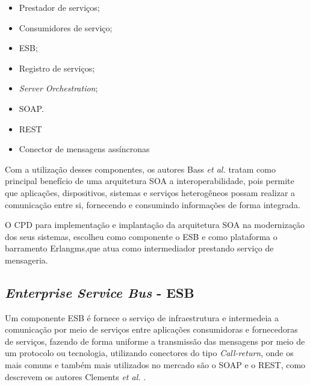 \begin{itemize}

\item Prestador de serviços;

\item Consumidores de serviço;

\item \acrfull{ESB};

\item Registro de serviços;

\item \textit{Server Orchestration}; 

\item \acrfull{SOAP}.

\item \acrfull{REST}

\item Conector de mensagens assíncronas

\end{itemize}

Com a utilização desses componentes, os autores Bass \textit{et al.}  \cite{bass2003software} tratam como principal benefício de uma arquitetura \acrshort{SOA} a interoperabilidade, pois permite que aplicações, dispositivos, sistemas e serviços heterogêneos possam realizar a comunicação entre si, fornecendo e consumindo informações  de forma integrada. 

O \acrshort{CPD} para implementação e implantação da arquitetura \acrshort{SOA} na modernização dos seus sistemas, escolheu como componente o \acrshort{ESB} e como plataforma o barramento Erlangms\cite{Agilar},que atua como intermediador prestando serviço de mensageria.


\subsection{\textit{Enterprise Service Bus} - ESB}

Um componente \acrshort{ESB} é fornece o serviço de infraestrutura e intermedeia a comunicação por meio de serviços entre aplicações consumidoras e fornecedoras de serviços, fazendo de forma uniforme a transmissão das mensagens por meio de um protocolo ou tecnologia, utilizando conectores do tipo \textit{Call-return}, onde os mais comuns e também mais utilizados no mercado são o \acrshort{SOAP} e o \acrshort{REST}, como descrevem  os autores Clements \textit{et al.} \cite{clements2002documenting}.

